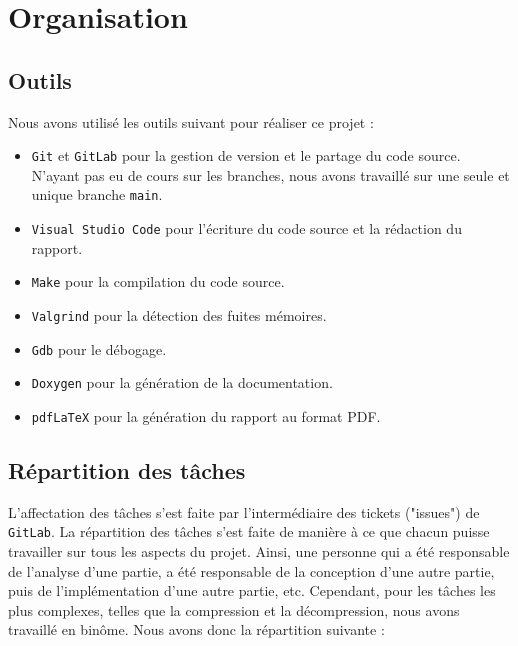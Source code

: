\section{Organisation}

\subsection{Outils}

Nous avons utilisé les outils suivant pour réaliser ce projet :

\begin{itemize}
    \item \texttt{Git} et \texttt{GitLab} pour la gestion de version et le partage du code source. N'ayant pas eu de cours sur les branches, nous avons travaillé sur une seule et unique branche \texttt{main}.
    \item \texttt{Visual Studio Code} pour l'écriture du code source et la rédaction du rapport.
    \item \texttt{Make} pour la compilation du code source.
    \item \texttt{Valgrind} pour la détection des fuites mémoires.
    \item \texttt{Gdb} pour le débogage.
    \item \texttt{Doxygen} pour la génération de la documentation.
    \item \texttt{pdfLaTeX} pour la génération du rapport au format PDF.
\end{itemize}

\subsection{Répartition des tâches}

L'affectation des tâches s'est faite par l'intermédiaire des tickets ("issues") de \texttt{GitLab}. 
La répartition des tâches s'est faite de manière à ce que chacun puisse travailler sur tous les aspects du projet. 
Ainsi, une personne qui a été responsable de l'analyse d'une partie, a été responsable de la conception d'une autre partie, puis de l'implémentation d'une autre partie, etc.
Cependant, pour les tâches les plus complexes, telles que la compression et la décompression, nous avons travaillé en binôme.
Nous avons donc la répartition suivante :

